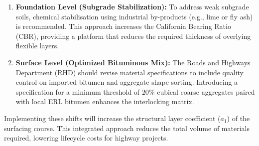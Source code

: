 \documentclass[12pt,a4paper]{article}
\begin{document}
\begin{enumerate}
    \item \textbf{Foundation Level (Subgrade Stabilization):} To address weak subgrade soils, chemical stabilisation using industrial by-products (e.g., lime or fly ash) is recommended. This approach increases the California Bearing Ratio (CBR), providing a platform that reduces the required thickness of overlying flexible layers.
    \item \textbf{Surface Level (Optimized Bituminous Mix):} The Roads and Highways Department (RHD) should revise material specifications to include quality control on imported bitumen and aggregate shape sorting. Introducing a specification for a minimum threshold of $20\%$ cubical coarse aggregates paired with local ERL bitumen enhances the interlocking matrix. 
\end{enumerate}

Implementing these shifts will increase the structural layer coefficient ($a_1$) of the surfacing course. This integrated approach reduces the total volume of materials required, lowering lifecycle costs for highway projects.
\end{document}
